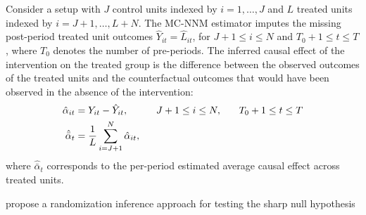 \documentclass[12pt]{article}
\begin{document}
Consider a setup with $J$ control units indexed by $i=1, \ldots, J$ and $L$ treated units indexed by $i = J+1, \ldots, L+N$. The MC-NNM estimator imputes the missing post-period treated unit outcomes $\hat{Y}_{it} = \hat{L}_{it}$, for $J+1 \leq i \leq N$ and $T_0+1 \leq t \leq T$, where $T_0$ denotes the number of pre-periods. The inferred causal effect of the intervention on the treated group is the difference between the observed outcomes of the treated units and the counterfactual outcomes that would have been observed in the absence of the intervention:
%
\begin{align}
\hat{\alpha}_{it} &= Y_{it} - \hat{Y}_{it}, \hspace{10mm} J+1 \leq i \leq N, \, \hspace{5mm} \, T_0+1 \leq t \leq T \\ 
\hat{\bar{\alpha}}_{t} & = \frac{1}{L} \sum^{N}_{i=J+1} \hat{\alpha}_{it},  \label{eq:avg-pointwise}
\end{align}
%
where $\hat{\bar{\alpha}}_{t}$ corresponds to the per-period estimated average causal effect across treated units. 

\citet{chernozhukov2017exact} propose a randomization inference approach for testing the sharp null hypothesis 
\end{document}
